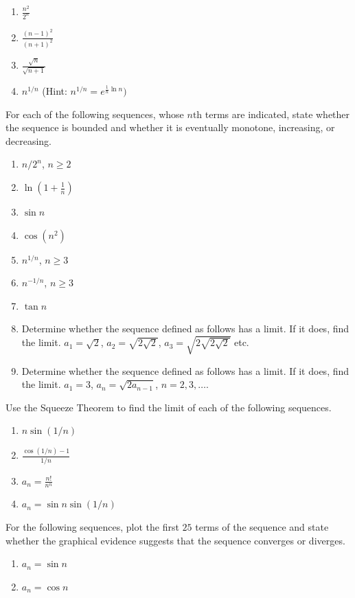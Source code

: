 \documentclass{exercises}
\begin{document}
\begin{enumerate}[resume]
\item $\frac{n^{2}}{2^{n}}$
\item $\frac{{(n-1)}^{2}}{{(n+1)}^{2}}$
\item $\frac{\sqrt{n}}{\sqrt{n+1}}$
\item $n^{1/n}$ (Hint: $n^{1/n}=e^{\frac{1}{n}\ln n})$
\end{enumerate}

For each of the following sequences, whose $n\text{th}$ terms are indicated, state whether the sequence is bounded and whether it is eventually monotone, increasing, or decreasing.

\begin{enumerate}[resume]
\item $n/2^{n}$, $n\ge2$
\item $\ln(1+\frac{1}{n})$
\item $\sin n$
\item $\cos(n^{2})$
\item $n^{1/n}$, $n\ge3$
\item $n^{-1/n}$, $n\ge3$
\item $\tan n$
\item Determine whether the sequence defined as follows has a limit. If it does, find the limit. $a_{1}=\sqrt{2}$, $a_{2}=\sqrt{2\sqrt{2}}$, $a_{3}=\sqrt{2\sqrt{2\sqrt{2}}}$ etc.
\item Determine whether the sequence defined as follows has a limit. If it does, find the limit. $a_{1}=3$, $a_{n}=\sqrt{2a_{n-1}}$, $n=2,3,\ldots$.
\end{enumerate}

Use the Squeeze Theorem to find the limit of each of the following sequences.

\begin{enumerate}[resume]
\item $n\sin(1/n)$
\item $\frac{\cos(1/n)-1}{1/n}$
\item $a_{n}=\frac{n!}{n^{n}}$
\item $a_{n}=\sin n\sin(1/n)$
\end{enumerate}

For the following sequences, plot the first $25$ terms of the sequence and state whether the graphical evidence suggests that the sequence converges or diverges.

\begin{enumerate}[resume]
\item \techrequired $a_{n}=\sin n$
\item \techrequired $a_{n}=\cos n$
\end{enumerate}
\end{document}
